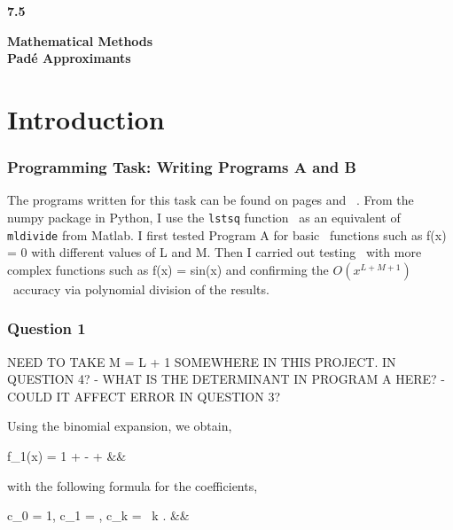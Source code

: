 \documentclass[12pt, a4paper]{article}
\begin{document}
	
	\setlength{\parindent}{0pt}
	\captionsetup{justification=centering}
	\lstset{
		showstringspaces=false	
	}
	
	
	\begin{titlepage}
		\LARGE
		\textbf{7.5}
		\begin{center}
			\vspace*{7cm}
			
			\LARGE
			\textbf{Mathematical Methods}
			\\
			\vspace{1cm}
			\textbf{Pad\'e Approximants}
			
			\vspace{0.5cm}
		\end{center}
	\end{titlepage}

\section{Introduction}	
	
\subsubsection*{Programming Task: Writing Programs A and B}

The programs written for this task can be found on pages \pageref{Program_A} and \
\pageref{Program_B}. From the numpy package in Python, I use the \texttt{lstsq} function \
as an equivalent of \texttt{mldivide} from Matlab. I first tested Program A for basic \
functions such as f(x) = 0 with different values of L and M. Then I carried out testing \
with more complex functions such as f(x) = sin(x) and confirming the $O(x^{L+M+1})$ \
accuracy via polynomial division of the results.


\subsubsection*{Question 1}

NEED TO TAKE M = L + 1 SOMEWHERE IN THIS PROJECT. IN QUESTION 4? - 
WHAT IS THE DETERMINANT IN PROGRAM A HERE?
- COULD IT AFFECT ERROR IN QUESTION 3?

Using the binomial expansion, we obtain,
\begin{flalign*}
	f_{1}(x) = 1 + \frac{x}{2} -  +  &&
\end{flalign*}
with the following formula for the coefficients,
\begin{flalign*}
	c_{0} = 1, \quad c_{1} = , \quad c_{k} =   \ 
	k . &&
\end{flalign*}
\end{document}
